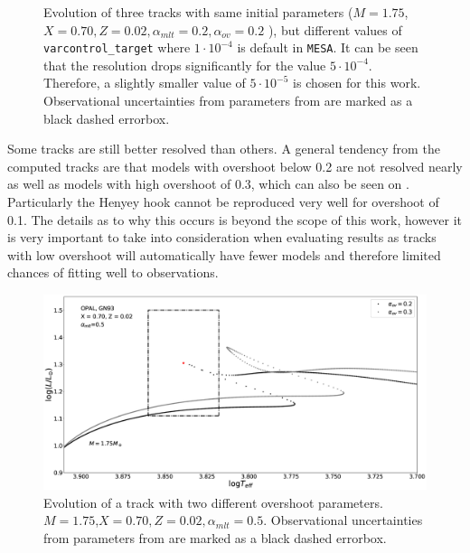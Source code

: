 \begin{figure}[htbp]
    \centering
    \caption{Evolution of three tracks with same initial parameters ($M= 1.75$\msun,$X=0.70, Z=0.02, \alpha_{mlt} = 0.2, \alpha_{ov} = 0.2$ ), but different values of \texttt{varcontrol\_target} where $1\cdot10^{-4}$ is default in \texttt{MESA}. It can be seen that the resolution drops significantly for the value $5\cdot10^{-4}$. Therefore, a slightly smaller value of $5\cdot10^{-5}$ is chosen for this work. Observational uncertainties from parameters from \citet{lenz2010delta} are marked as a black dashed errorbox. }
    \label{varcontrol}
\end{figure}


Some tracks are still better resolved than others. A general tendency from the computed tracks are that models with overshoot below 0.2 are not resolved nearly as well as models with high overshoot of 0.3, which can also be seen on . Particularly the Henyey hook cannot be reproduced very well for overshoot of 0.1. The details as to why this occurs is beyond the scope of this work, however it is very important to take into consideration when evaluating results as tracks with low overshoot will automatically have fewer models and therefore limited chances of fitting well to observations. 

\begin{figure}[htbp]
    \centering
    \includegraphics[width=1\textwidth]{resolution_overshoot.eps}
    \caption{Evolution of a track with two different overshoot parameters. $M= 1.75$\msun,$X=0.70, Z=0.02, \alpha_{mlt} = 0.5$.  Observational uncertainties from parameters from \citet{lenz2010delta} are marked as a black dashed errorbox.}
    \label{ovresol}
  \end{figure}


